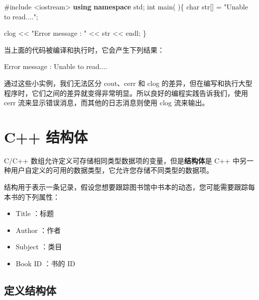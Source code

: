 \documentclass[
]{article}
\newenvironment{Shaded}{}{}
\newcommand{\DataTypeTok}[1]{\textcolor[rgb]{0.56,0.13,0.00}{#1}}
\newcommand{\ImportTok}[1]{#1}
\newcommand{\KeywordTok}[1]{\textcolor[rgb]{0.00,0.44,0.13}{\textbf{#1}}}
\newcommand{\NormalTok}[1]{#1}
\newcommand{\OperatorTok}[1]{\textcolor[rgb]{0.40,0.40,0.40}{#1}}
\newcommand{\PreprocessorTok}[1]{\textcolor[rgb]{0.74,0.48,0.00}{#1}}
\newcommand{\StringTok}[1]{\textcolor[rgb]{0.25,0.44,0.63}{#1}}
\providecommand{\tightlist}{%
  \setlength{\itemsep}{0pt}\setlength{\parskip}{0pt}}
\begin{document}
\begin{Shaded}
\begin{Highlighting}[]
\PreprocessorTok{\#include }\ImportTok{\textless{}iostream\textgreater{}}
\KeywordTok{using} \KeywordTok{namespace}\NormalTok{ std}\OperatorTok{;}
\DataTypeTok{int}\NormalTok{ main}\OperatorTok{(} \OperatorTok{)\{}
   \DataTypeTok{char}\NormalTok{ str}\OperatorTok{[]} \OperatorTok{=} \StringTok{"Unable to read...."}\OperatorTok{;}
 
\NormalTok{   clog }\OperatorTok{\textless{}\textless{}} \StringTok{"Error message : "} \OperatorTok{\textless{}\textless{}}\NormalTok{ str }\OperatorTok{\textless{}\textless{}}\NormalTok{ endl}\OperatorTok{;}
\OperatorTok{\}}
\end{Highlighting}
\end{Shaded}

当上面的代码被编译和执行时，它会产生下列结果：

\begin{Shaded}
\begin{Highlighting}[]
\NormalTok{Error message }\OperatorTok{:}\NormalTok{ Unable to read}\OperatorTok{....}
\end{Highlighting}
\end{Shaded}

通过这些小实例，我们无法区分 cout、cerr 和 clog
的差异，但在编写和执行大型程序时，它们之间的差异就变得非常明显。所以良好的编程实践告诉我们，使用
cerr 流来显示错误消息，而其他的日志消息则使用 clog 流来输出。

\hypertarget{c-ux7ed3ux6784ux4f53}{%
\section{C++ 结构体}\label{c-ux7ed3ux6784ux4f53}}

C/C++ 数组允许定义可存储相同类型数据项的变量，但是\textbf{结构体}是 C++
中另一种用户自定义的可用的数据类型，它允许您存储不同类型的数据项。

结构用于表示一条记录，假设您想要跟踪图书馆中书本的动态，您可能需要跟踪每本书的下列属性：

\begin{itemize}
\tightlist
\item
  Title ：标题
\item
  Author ：作者
\item
  Subject ：类目
\item
  Book ID ：书的 ID
\end{itemize}

\hypertarget{ux5b9aux4e49ux7ed3ux6784ux4f53}{%
\subsection{定义结构体}\label{ux5b9aux4e49ux7ed3ux6784ux4f53}}
\end{document}
